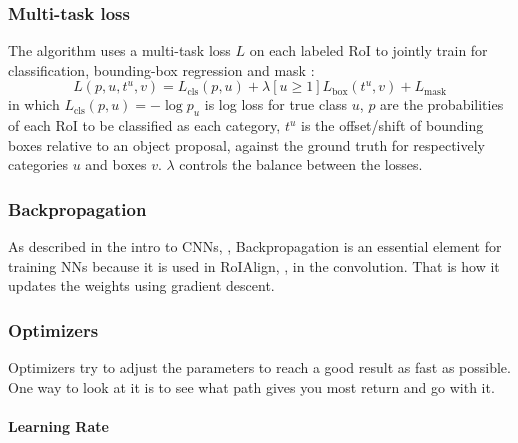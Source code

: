 \subsubsection{Multi-task loss}\label{s:loss-multi}

The algorithm uses a multi-task loss $L$ on each labeled RoI to jointly train for classification, bounding-box regression \cite{Girshick_2015} and mask \cite{He_2017} :
\begin{equation}
\label{e:loss}
L(p, u, t^u, v) = L_\textrm{cls}(p, u) + \lambda [u \ge 1] L_\textrm{box}(t^u, v) + L_\textrm{mask}
\end{equation}
in which $L_\textrm{cls}(p, u) = -\log p_u$ is log loss for true class $u$, $p$ are the probabilities of each RoI to be classified as each category, $t^u$ is the offset/shift of bounding boxes relative to an object proposal, against the ground truth for respectively categories $u$ and boxes $v$.
$\lambda$ controls the balance between the losses.


\subsubsection{Backpropagation}\label{s:trainalg-backprop}

As described in the intro to CNNs, , Backpropagation is an essential element for training NNs because it is used in RoIAlign, , in the convolution. That is how it updates the weights using gradient descent.


\subsubsection{Optimizers}\label{s:trainalg-opt}

Optimizers try to adjust the parameters to reach a good result as fast as possible. One way to look at it is to see what path gives you most return and go with it.

\paragraph{Learning Rate}\label{s:trainalg-opt-lr}

